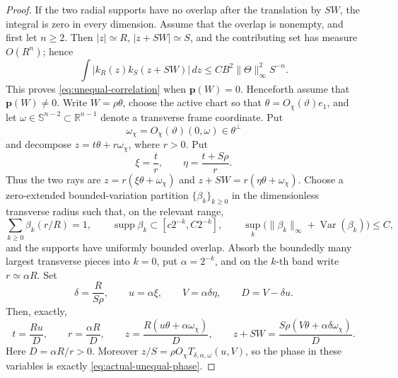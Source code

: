 \documentclass[11pt]{article}
\numberwithin{equation}{section}
\theoremstyle{remark}
\theoremstyle{definition}
\newcommand{\Sph}{\mathbb S}
\newcommand{\supp}{\operatorname{supp}}
\newcommand{\Var}{\operatorname{Var}}
\newcommand{\norm}[1]{\lVert #1\rVert}
\begin{document}
\begin{proof}
If the two radial supports have no overlap after the translation by
\(SW\), the integral is zero in every dimension.  Assume that the overlap
is nonempty, and first let \(n\ge2\).  Then \(|z|\simeq R\),
\(|z+SW|\simeq S\), and the contributing
set has measure \(O(R^n)\); hence
\begin{equation}\label{eq:unequal-trivial}
 \int |k_R(z)k_S(z+SW)|\,dz
 \le CB^2\norm\Theta_\infty^2S^{-n}.
\end{equation}
This proves \eqref{eq:unequal-correlation} when \(\mathbf p(W)=0\).
Henceforth assume that \(\mathbf p(W)\ne0\).  Write
\(W=\rho\theta\), choose the active chart so that
\(\theta=O_\chi(\vartheta)e_1\), and let
\(\omega\in\Sph^{n-2}\subset\mathbb R^{n-1}\) denote a transverse
frame coordinate.  Put
\[
 \omega_\chi=O_\chi(\vartheta)(0,\omega)\in\theta^\perp
\]
and decompose \(z=t\theta+r\omega_\chi\), where \(r>0\).  Put
\[
 \xi=\frac{t}{r},\qquad
 \eta=\frac{t+S\rho}{r}.
\]
Thus the two rays are \(z=r(\xi\theta+\omega_\chi)\) and
\(z+SW=r(\eta\theta+\omega_\chi)\).  Choose a zero-extended bounded-variation
partition $\{\beta_k\}_{k\ge0}$ in the dimensionless transverse radius
such that, on the relevant range,
\[
 \sum_{k\ge0}\beta_k(r/R)=1,\qquad
 \supp\beta_k\subset[c2^{-k},C2^{-k}],
 \qquad
 \sup_k\bigl(\norm{\beta_k}_\infty+\Var(\beta_k)\bigr)\le C,
\]
and the supports have uniformly bounded overlap.  Absorb the boundedly
many largest transverse pieces into $k=0$, put $\alpha=2^{-k}$, and on
the $k$-th band write $r\simeq\alpha R$.  Set
\begin{equation}\label{eq:unequal-ray-normalization}
 \delta=\frac{R}{S\rho},\qquad
 u=\alpha\xi,\qquad V=\alpha\delta\eta,\qquad
 D=V-\delta u.
\end{equation}
Then, exactly,
\begin{equation}\label{eq:unequal-two-ray-exact}
 t=\frac{Ru}{D},\qquad r=\frac{\alpha R}{D},\qquad
 z=\frac{R(u\theta+\alpha\omega_\chi)}{D},\qquad
 z+SW=\frac{S\rho(V\theta+\alpha\delta\omega_\chi)}{D}.
\end{equation}
Here $D=\alpha R/r>0$.  Moreover
\(z/S=\rho O_\chi T_{\delta,\alpha,\omega}(u,V)\), so
the phase in these variables is exactly
\eqref{eq:actual-unequal-phase}.


\end{proof}
\end{document}
